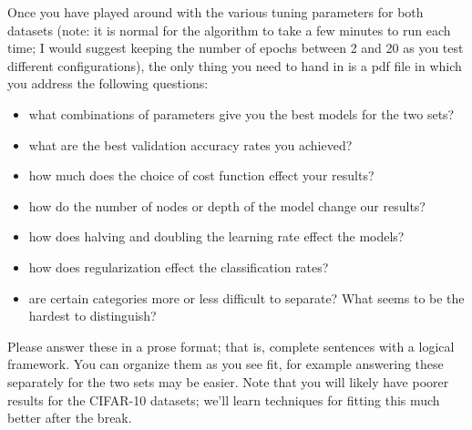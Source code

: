 \documentclass[12pt]{article}
\begin{document}
Once you have played around with the various tuning parameters for both datasets
(note: it is normal for the algorithm to take a few minutes to run each time; I would
suggest keeping the number of epochs between 2 and 20 as you test different configurations),
the only thing you need to hand in is a pdf file in which you address the following
questions:
\begin{itemize}
\item what combinations of parameters give you the best models for the two sets?
\item what are the best validation accuracy rates you achieved?
\item how much does the choice of cost function effect your results?
\item how do the number of nodes or depth of the model change our results?
\item how does halving and doubling the learning rate effect the models?
\item how does regularization effect the classification rates?
\item are certain categories more or less difficult to separate? What seems to be
the hardest to distinguish?
\end{itemize}
Please answer these in a prose format; that is, complete sentences with a logical framework.
You can organize them as you see fit, for example answering these separately for the two
sets may be easier. Note that you will likely have poorer results for the CIFAR-10
datasets; we'll learn techniques for fitting this much better after the break.
\end{document}
